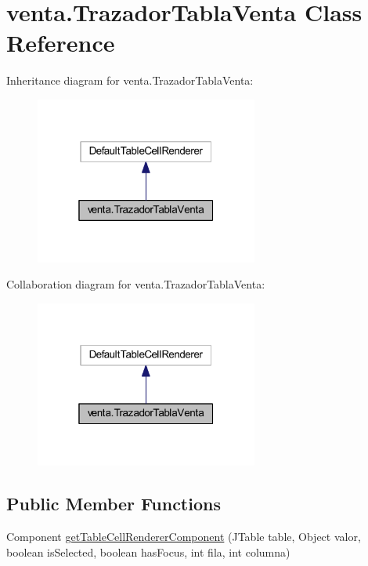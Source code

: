 \hypertarget{classventa_1_1_trazador_tabla_venta}{}\section{venta.\+Trazador\+Tabla\+Venta Class Reference}
\label{classventa_1_1_trazador_tabla_venta}


Inheritance diagram for venta.\+Trazador\+Tabla\+Venta\+:
\nopagebreak
\begin{figure}[H]
\begin{center}
\leavevmode
\includegraphics[width=208pt]{classventa_1_1_trazador_tabla_venta__inherit__graph}
\end{center}
\end{figure}


Collaboration diagram for venta.\+Trazador\+Tabla\+Venta\+:
\nopagebreak
\begin{figure}[H]
\begin{center}
\leavevmode
\includegraphics[width=208pt]{classventa_1_1_trazador_tabla_venta__coll__graph}
\end{center}
\end{figure}
\subsection*{Public Member Functions}
\begin{DoxyCompactItemize}
\item 
Component \mbox{\hyperlink{classventa_1_1_trazador_tabla_venta_a99e2a2bf259c21864697e3e27f7f431d}{get\+Table\+Cell\+Renderer\+Component}} (J\+Table table, Object valor, boolean is\+Selected, boolean has\+Focus, int fila, int columna)
\end{DoxyCompactItemize}


